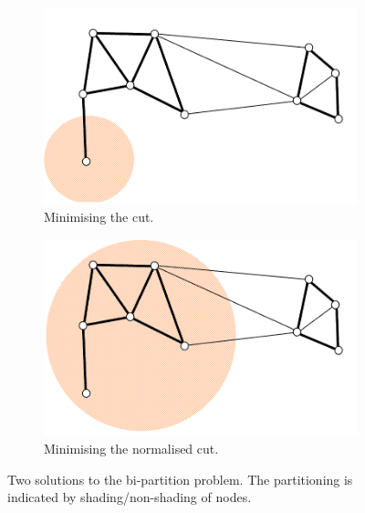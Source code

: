 \begin{figure}[H]
  \centering
  \begin{subfigure}{0.4\textwidth}
    \centering
    \includegraphics[width = \textwidth]{my_min_cut.png}
    \caption{Minimising the cut.}
  \label{fig:min_cut}
  \end{subfigure}
  \begin{subfigure}{0.4\textwidth}
    \centering
    \includegraphics[width = \textwidth]{my_norm_cut.png}
  \caption{Minimising the normalised cut.}
  \label{fig:norm_cut}
  \end{subfigure}
  \caption{Two solutions to the bi-partition problem. The partitioning is indicated by shading/non-shading of nodes.}
  \label{fig:min_norm_cut}
\end{figure}

